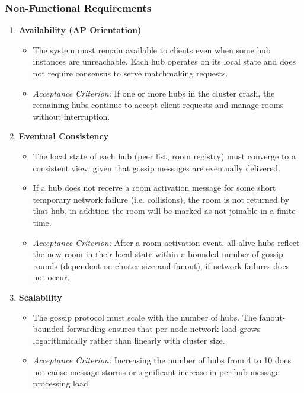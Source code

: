 \subsubsection{Non-Functional Requirements}
\begin{enumerate}
    \item \textbf{Availability (AP Orientation)}
    \begin{itemize}
        \item The system must remain available to clients even when some hub instances are unreachable. Each hub operates on its local state and does not require consensus to serve matchmaking requests.
        \item \textit{Acceptance Criterion:} If one or more hubs in the cluster crash, the remaining hubs continue to accept client requests and manage rooms without interruption.
    \end{itemize}

    \item \textbf{Eventual Consistency}
    \begin{itemize}
        \item The local state of each hub (peer list, room registry) must converge to a consistent view, given that gossip messages are eventually delivered.
        \item If a hub does not receive a room activation message for some short temporary network failure (i.e. collisions), the room is not returned by that hub, in addition the room will be marked as not joinable in a finite time.
        \item \textit{Acceptance Criterion:} After a room activation event, all alive hubs reflect the new room in their local state within a bounded number of gossip rounds (dependent on cluster size and fanout), if network failures does not occur.
    \end{itemize}

    \item \textbf{Scalability}
    \begin{itemize}
        \item The gossip protocol must scale with the number of hubs. The fanout-bounded forwarding ensures that per-node network load grows logarithmically rather than linearly with cluster size.
        \item \textit{Acceptance Criterion:} Increasing the number of hubs from 4 to 10 does not cause message storms or significant increase in per-hub message processing load.
    \end{itemize}


\end{enumerate}
